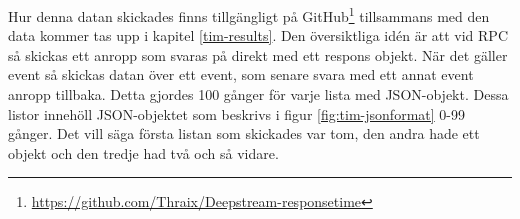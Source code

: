 Hur denna datan skickades finns tillgängligt på GitHub\footnote{\href{https://github.com/Thraix/Deepstream-responsetime}{https://github.com/Thraix/Deepstream-responsetime} } tillsammans med den data kommer tas upp i kapitel \ref{tim-results}. Den översiktliga idén är att vid RPC så skickas ett anropp som svaras på direkt med ett respons objekt. När det gäller event så skickas datan över ett event, som senare svara med ett annat event anropp tillbaka. Detta gjordes 100 gånger för varje lista med JSON-objekt. Dessa listor innehöll JSON-objektet som beskrivs i figur \ref{fig:tim-jsonformat} 0-99 gånger. Det vill säga första listan som skickades var tom, den andra hade ett objekt och den tredje had två och så vidare. 

